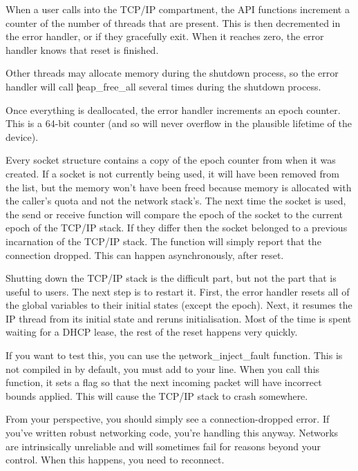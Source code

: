 {When a user calls into the TCP/IP compartment, the API functions increment a counter of the number of threads that are present.
This is then decremented in the error handler, or if they gracefully exit.
When it reaches zero, the error handler knows that reset is finished.

Other threads may allocate memory during the shutdown process, so the error handler will call \c{heap_free_all} several times during the shutdown process.

Once everything is deallocated, the error handler increments an epoch counter.
This is a 64-bit counter (and so will never overflow in the plausible lifetime of the device).

Every socket structure contains a copy of the epoch counter from when it was created.
If a socket is not currently being used, it will have been removed from the list, but the memory won't have been freed because memory is allocated with the caller's quota and not the network stack's.
The next time the socket is used, the send or receive function will compare the epoch of the socket to the current epoch of the TCP/IP stack.
If they differ then the socket belonged to a previous incarnation of the TCP/IP stack.
The function will simply report that the connection dropped.
This can happen asynchronously, after reset.

Shutting down the TCP/IP stack is the difficult part, but not the part that is useful to users.
The next step is to restart it.
First, the error handler resets all of the global variables to their initial states (except the epoch).
Next, it resumes the IP thread from its initial state and reruns initialisation.
Most of the time is spent waiting for a DHCP lease, the rest of the reset happens very quickly.

If you want to test this, you can use the \c{network_inject_fault} function.
This is not compiled in by default, you must add  to your   line.
When you call this function, it sets a flag so that the next incoming packet will have incorrect bounds applied.
This will cause the TCP/IP stack to crash somewhere.


From your perspective, you should simply see a connection-dropped error.
If you've written robust networking code, you're handling this anyway.
Networks are intrinsically unreliable and will sometimes fail for reasons beyond your control.
When this happens, you need to reconnect.

}
